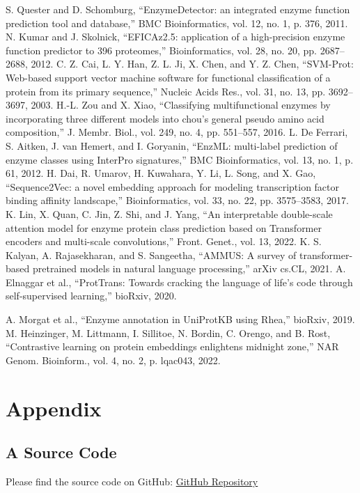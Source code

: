 \documentclass[conference]{IEEEtran}
\begin{document}
\begin{thebibliography}{00}
S. Quester and D. Schomburg, “EnzymeDetector: an integrated enzyme function prediction tool and database,” BMC Bioinformatics, vol. 12, no. 1, p. 376, 2011.
N. Kumar and J. Skolnick, “EFICAz2.5: application of a high-precision enzyme function predictor to 396 proteomes,” Bioinformatics, vol. 28, no. 20, pp. 2687–2688, 2012.
C. Z. Cai, L. Y. Han, Z. L. Ji, X. Chen, and Y. Z. Chen, “SVM-Prot: Web-based support vector machine software for functional classification of a protein from its primary sequence,” Nucleic Acids Res., vol. 31, no. 13, pp. 3692–3697, 2003.
H.-L. Zou and X. Xiao, “Classifying multifunctional enzymes by incorporating three different models into chou’s general pseudo amino acid composition,” J. Membr. Biol., vol. 249, no. 4, pp. 551–557, 2016.
L. De Ferrari, S. Aitken, J. van Hemert, and I. Goryanin, “EnzML: multi-label prediction of enzyme classes using InterPro signatures,” BMC Bioinformatics, vol. 13, no. 1, p. 61, 2012.
H. Dai, R. Umarov, H. Kuwahara, Y. Li, L. Song, and X. Gao, “Sequence2Vec: a novel embedding approach for modeling transcription factor binding affinity landscape,” Bioinformatics, vol. 33, no. 22, pp. 3575–3583, 2017.
K. Lin, X. Quan, C. Jin, Z. Shi, and J. Yang, “An interpretable double-scale attention model for enzyme protein class prediction based on Transformer encoders and multi-scale convolutions,” Front. Genet., vol. 13, 2022.
 K. S. Kalyan, A. Rajasekharan, and S. Sangeetha, “AMMUS: A survey of transformer-based pretrained models in natural language processing,” arXiv cs.CL, 2021.
A. Elnaggar et al., “ProtTrans: Towards cracking the language of life’s code through self-supervised learning,” bioRxiv, 2020.

A. Morgat et al., “Enzyme annotation in UniProtKB using Rhea,” bioRxiv, 2019.
M. Heinzinger, M. Littmann, I. Sillitoe, N. Bordin, C. Orengo, and B. Rost, “Contrastive learning on protein embeddings enlightens midnight zone,” NAR Genom. Bioinform., vol. 4, no. 2, p. lqac043, 2022.
 
\end{thebibliography}
\vspace{12pt}



\section*{Appendix}

\subsection*{A Source Code}


Please find the source code on GitHub: \href{https://github.com/UgurDURA/Protein-Active-Site-w-ML.git}{GitHub Repository}
\end{document}
